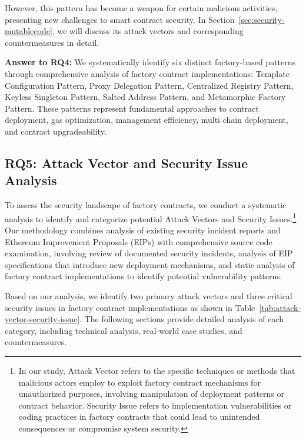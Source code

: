\documentclass[acmsmall, screen]{acmart}
\begin{document}
	However, this pattern has become a weapon for certain malicious activities, presenting new
	challenges to smart contract security. In Section~\ref{sec:security-mutablecode}, we will
	discuss its attack vectors and corresponding countermeasures in detail.

	\begin{answerbox}
		\textbf{Answer to RQ4:} We systematically identify six distinct factory-based patterns
		through comprehensive analysis of factory contract implementations: Template Configuration Pattern,
		Proxy Delegation Pattern, Centralized Registry Pattern, Keyless Singleton Pattern, Salted Address
		Pattern, and Metamorphic Factory Pattern. These patterns represent fundamental approaches to
contract deployment, gas optimization, management efficiency, multi chain deployment, and contract
upgradeability.
	\end{answerbox}

	\subsection{RQ5: Attack Vector and Security Issue Analysis}
	\label{sec:rq5securityrisks} To assess the security landscape of factory contracts, we conduct a
	systematic analysis to identify and categorize potential Attack Vectors and Security Issues.\footnote{In
	our study, Attack Vector refers to the specific techniques or methods that malicious actors employ
	to exploit factory contract mechanisms for unauthorized purposes, involving manipulation of
	deployment patterns or contract behavior. Security Issue refers to implementation vulnerabilities
	or coding practices in factory contracts that could lead to unintended consequences or compromise
	system security.} Our methodology combines analysis of existing security incident reports and
	Ethereum Improvement Proposals (EIPs) with comprehensive source code examination, involving review
	of documented security incidents, analysis of EIP specifications that introduce new deployment
	mechanisms, and static analysis of factory contract implementations to identify potential vulnerability
	patterns.

	

	Based on our analysis, we identify two primary attack vectors and three critical security issues
	in factory contract implementations as shown in Table~\ref{tab:attack-vector-security-issue}.
	The following sections provide detailed analysis of each category, including technical analysis,
	real-world case studies, and countermeasures.
\end{document}
